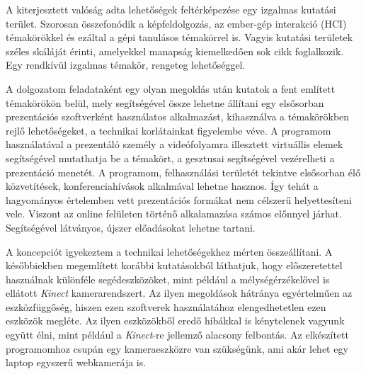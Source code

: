 




A kiterjesztett valóság adta lehetőségek feltérképezése egy izgalmas kutatási terület. Szorosan összefonódik a képfeldolgozás, az ember-gép interakció (HCI) témakörökkel és ezáltal a gépi tanulásos témakörrel is. Vagyis kutatási területek széles skáláját érinti, amelyekkel manapság kiemelkedően sok cikk foglalkozik. Egy rendkívül izgalmas témakör, rengeteg lehetőséggel.

A dolgozatom feladataként egy olyan megoldás után kutatok a fent említett témakörökön belül, mely segítségével össze lehetne állítani egy elsősorban prezentációs szoftverként használatos alkalmazást, kihasználva a témakörökben rejlő lehetőségeket, a technikai korlátainkat figyelembe véve. A programom használatával a prezentáló személy a videófolyamra illesztett virtuállis elemek segítségével mutathatja be a témakört, a gesztusai segítségével vezérelheti a prezentáció menetét. A programom, felhasználási területét tekintve elsősorban élő közvetítések, konferenciahívások alkalmával lehetne hasznos. Így tehát a hagyományos értelemben vett prezentációs formákat nem célszerű helyettesíteni vele. Viszont az online felületen történő alkalamazása számos előnnyel járhat. Segítségével látványos, újszer előadásokat lehetne tartani.

A koncepciót igyekeztem a technikai lehetőségekhez mérten összeállítani. A későbbiekben megemlített korábbi kutatásokból láthatjuk, hogy előszeretettel használnak különféle segédeszközöket, mint például a mélységérzékelővel is ellátott \textit{Kinect} kamerarendszert. Az ilyen megoldások hátránya egyértelműen az eszközfüggőség, hiszen ezen szoftverek használatához elengedhetetlen ezen eszközök megléte. Az ilyen eszközökből eredő hibákkal is kénytelenek vagyunk együtt élni, mint például a \textit{Kinect}-re jellemző alacsony felbontás. Az elkészített programomhoz csupán egy kameraeszközre van szükségünk, ami akár lehet egy laptop egyszerű webkamerája is.

